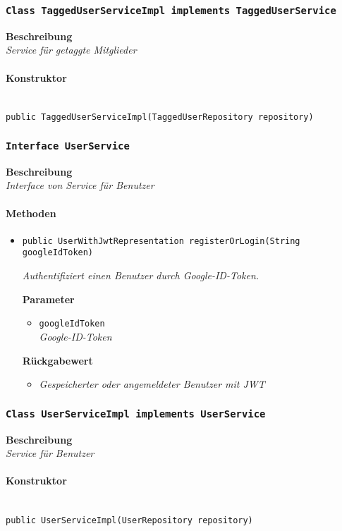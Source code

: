      \subsubsection{\texttt{Class TaggedUserServiceImpl implements TaggedUserService}}
     \textbf{Beschreibung} \\
     \textit{Service für getaggte Mitglieder}
     \paragraph*{Konstruktor}\mbox{} \\
     \texttt{public TaggedUserServiceImpl(TaggedUserRepository repository)}
     \subsubsection{\texttt{Interface UserService}}
     \textbf{Beschreibung} \\
     \textit{Interface von Service für Benutzer}
     \paragraph*{Methoden}
     \begin{itemize}
     	\item{\texttt{public UserWithJwtRepresentation registerOrLogin(String googleIdToken)}}
     	
     	\textit{Authentifiziert einen Benutzer durch Google-ID-Token.}
     	
     	\textbf{Parameter}
     	\begin{itemize}
     		\item\texttt{googleIdToken}\\
     		\textit{Google-ID-Token}
     	\end{itemize}
     	
     	\textbf{Rückgabewert}
     	\begin{itemize}
     		\item\textit{Gespeicherter oder angemeldeter Benutzer mit JWT}
     	\end{itemize}
     \end{itemize}
 
     \subsubsection{\texttt{Class UserServiceImpl implements UserService}}
     \textbf{Beschreibung} \\
     \textit{Service für Benutzer}
     \paragraph*{Konstruktor}\mbox{} \\
     \texttt{public UserServiceImpl(UserRepository repository)}

%